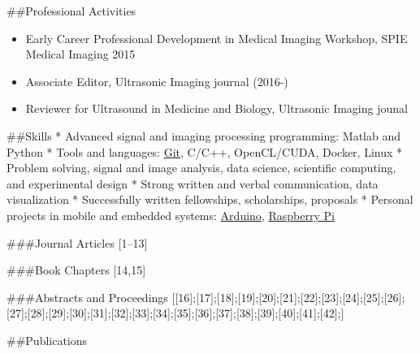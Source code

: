 \documentclass[
]{article}
\providecommand{\tightlist}{%
  \setlength{\itemsep}{0pt}\setlength{\parskip}{0pt}}
\begin{document}
\#\#Professional Activities

\begin{itemize}
\tightlist
\item
  Early Career Professional Development in Medical Imaging Workshop,
  SPIE Medical Imaging 2015
\item
  Associate Editor, Ultrasonic Imaging journal (2016-)
\item
  Reviewer for Ultrasound in Medicine and Biology, Ultrasonic Imaging
  jounal
\end{itemize}

\#\#Skills * Advanced signal and imaging processing programming: Matlab
and Python * Tools and languages: \href{http://git-scm.com/}{Git},
C/C++, OpenCL/CUDA, Docker, Linux * Problem solving, signal and image
analysis, data science, scientific computing, and experimental design *
Strong written and verbal communication, data visualization *
Successfully written fellowships, scholarships, proposals * Personal
projects in mobile and embedded systems:
\href{http://www.arduino.cc/}{Arduino},
\href{http://www.raspberrypi.org/}{Raspberry Pi}

\#\#\#Journal Articles {[}1--13{]}

\#\#\#Book Chapters {[}14,15{]}

\#\#\#Abstracts and Proceedings
{[}{[}16{]};{[}17{]};{[}18{]};{[}19{]};{[}20{]};{[}21{]};{[}22{]};{[}23{]};{[}24{]};{[}25{]};{[}26{]};{[}27{]};{[}28{]};{[}29{]};{[}30{]};{[}31{]};{[}32{]};{[}33{]};{[}34{]};{[}35{]};{[}36{]};{[}37{]};{[}38{]};{[}39{]};{[}40{]};{[}41{]};{[}42{]};{]}

\#\#Publications
\end{document}
